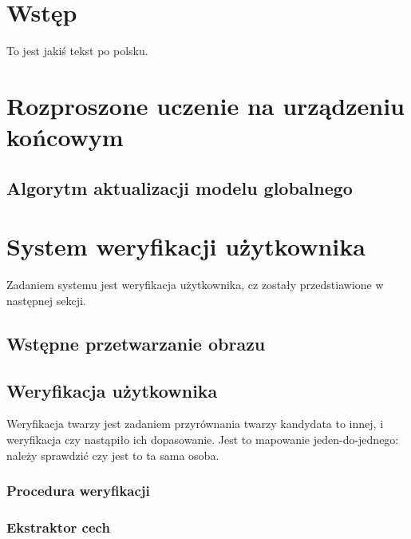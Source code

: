 \newpage
\section[Wstęp]{Wstęp}
To jest jakiś tekst po polsku. 

\section{Rozproszone uczenie na urządzeniu końcowym}

\subsection{Algorytm aktualizacji modelu globalnego}


\section{System weryfikacji użytkownika}

Zadaniem systemu jest weryfikacja użytkownika, cz zostały przedstiawione w następnej sekcji.

\subsection{Wstępne przetwarzanie obrazu}

\subsection{Weryfikacja użytkownika}
Weryfikacja twarzy jest zadaniem przyrównania twarzy kandydata to innej, i weryfikacja czy nastąpiło ich dopasowanie. Jest to mapowanie jeden-do-jednego: należy sprawdzić czy jest to ta sama osoba.

\subsubsection{Procedura weryfikacji}
\subsubsection{Ekstraktor cech}


